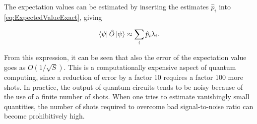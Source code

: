The expectation values can be estimated by inserting the estimates $\hat{p}_i$ into \cref{eq:ExpectedValueExact}, giving

\begin{equation}\label{eq:ExpectedValueEstimate}
    \bra{\psi}\hat{O}\ket{\psi} \approx \sum_{i} \hat{p}_i\lambda_i.
\end{equation}

From this expression, it can be seen that also the error of the expectation value goes as $O(1/\sqrt{S})$. This is a computationally expensive aspect of quantum computing, since a reduction of error by a factor 10 requires a factor 100 more shots. In practice, the output of quantum circuits tends to be noisy because of the use of a finite number of shots. When one tries to estimate vanishingly small quantities, the number of shots required to overcome bad signal-to-noise ratio can become prohibitively high. 






